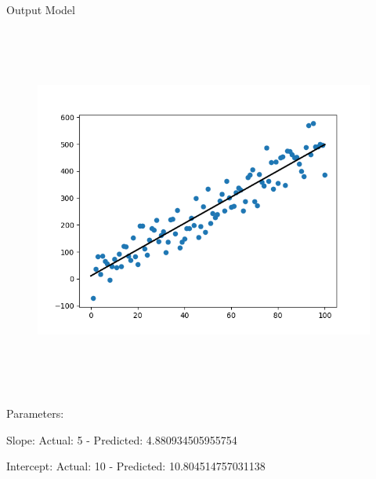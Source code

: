 \documentclass[12pt]{article}
\renewcommand{\_}{\kern-1.5pt\textunderscore\kern-1.5pt}
\begin{document}
\begin{enumerate}
\vspace{\baselineskip}

\vspace{\baselineskip}

\vspace{\baselineskip}

\vspace{\baselineskip}
\textcolor[HTML]{222222}{Output Model}\par




\begin{figure}[H]
	\begin{Center}
		\includegraphics[width=6.4in,height=4.81in]{./media/image37.png}
	\end{Center}
\end{figure}



\par

\textcolor[HTML]{222222}{Parameters:}\par

\textcolor[HTML]{222222}{Slope: Actual: 5 - Predicted: 4.880934505955754}\par

\textcolor[HTML]{222222}{Intercept: Actual: 10 - Predicted: 10.804514757031138}\par


\end{enumerate}
\end{document}
